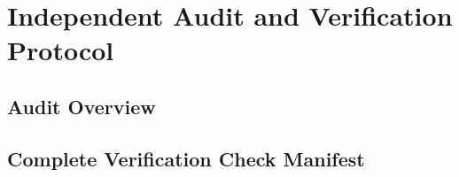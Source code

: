 \chapter{Independent Audit and Verification Protocol} \label{app:audit}

\section{Audit Overview}

\section{Complete Verification Check Manifest}
